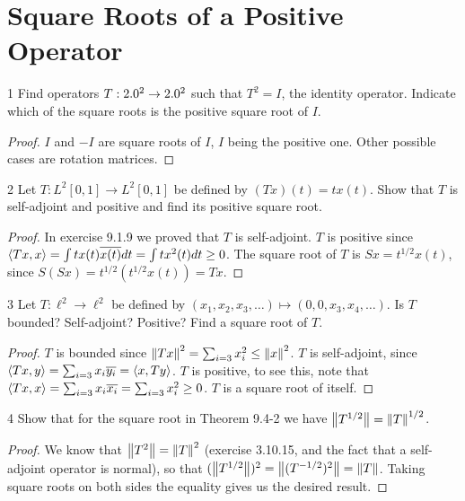 \section{Square Roots of a Positive Operator}


\begin{exercise}{1}
Find operators $T: 2.0^2 \to 2.0^2$ such that $T^2 = I$, the identity operator.
Indicate which of the square roots is the positive square root of $I$.
\end{exercise}
\begin{proof}
$I$ and $-I$ are square roots of $I$, $I$ being the positive one.
Other possible cases are rotation matrices.
\end{proof} 

\begin{exercise}{2}
Let $T: L^2[0, 1] \to L^2[0, 1]$ be defined by $(Tx)(t) = t x(t)$.
Show that $T$ is self-adjoint and positive and find its positive square root.
\end{exercise}
\begin{proof}
In exercise 9.1.9 we proved that $T$ is self-adjoint.
$T$ is positive since $\langle Tx, x\rangle = \int t x(t) \overline{x(t)} dt = \int t x^2(t) dt \geq 0$.
The square root of $T$ is $Sx = t^{1/2} x(t)$, since $S(Sx) = t^{1/2} (t^{1/2} x(t)) = Tx$.
\end{proof} 

\begin{exercise}{3}
Let $T: \ell^2 \to \ell^2$ be defined by $(x_1, x_2, x_3, \dots) \mapsto (0, 0, x_3, x_4, \dots)$.
Is $T$ bounded?
Self-adjoint?
Positive?
Find a square root of $T$.
\end{exercise}
\begin{proof}
$T$ is bounded since $\left\lVert Tx\right\rVert^2 = \sum_{i=3}x_i^2 \leq \left\lVert x\right\rVert^2$.
$T$ is self-adjoint, since $\langle Tx, y\rangle = \sum_{i=3}x_i \overline{y_i} = \langle x, Ty\rangle$.
$T$ is positive, to see this, note that $\langle Tx, x\rangle = \sum_{i=3}x_i \overline{x_i} = \sum_{i=3} x_i^2 \geq 0$.
$T$ is a square root of itself.
\end{proof} 

\begin{exercise}{4}
Show that for the square root in Theorem 9.4-2 we have $\left\lVert T^{1/2}\right\rVert = \left\lVert T\right\rVert^{1/2}$.
\end{exercise}
\begin{proof}
We know that $\left\lVert T^2\right\rVert = \left\lVert T\right\rVert^2$ (exercise 3.10.15, and the fact that a self-adjoint operator is normal), so that $(\left\lVert T^{1/2}\right\rVert)^2  = \left\lVert (T^{-1/2})^2\right\rVert = \left\lVert T\right\rVert$.
Taking square roots on both sides the equality gives us the desired result.
\end{proof} 

